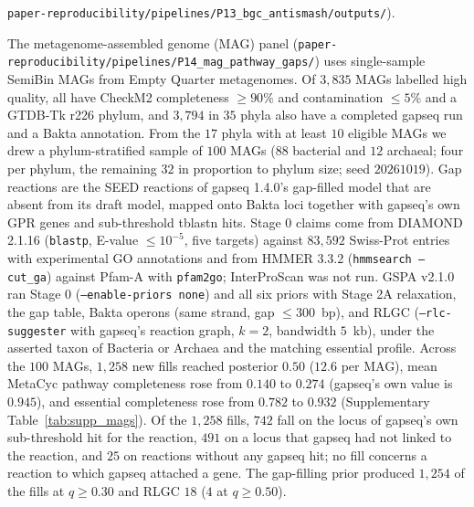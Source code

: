 \documentclass[10pt]{article}
\newcommand{\fn}[1]{\nolinkurl{#1}}
\begin{document}
\fn{paper-reproducibility/pipelines/P13_bgc_antismash/outputs/}).

The metagenome-assembled genome (MAG) panel (\fn{paper-reproducibility/pipelines/P14_mag_pathway_gaps/}) uses single-sample SemiBin MAGs from Empty Quarter metagenomes. Of $3{,}835$ MAGs labelled high quality, all have CheckM2 completeness $\ge 90\%$ and contamination $\le 5\%$ and a GTDB-Tk r226 phylum, and $3{,}794$ in $35$ phyla also have a completed gapseq run and a Bakta annotation. From the $17$ phyla with at least $10$ eligible MAGs we drew a phylum-stratified sample of $100$ MAGs ($88$ bacterial and $12$ archaeal; four per phylum, the remaining $32$ in proportion to phylum size; seed $20261019$). Gap reactions are the SEED reactions of gapseq 1.4.0's gap-filled model that are absent from its draft model, mapped onto Bakta loci together with gapseq's own GPR genes and sub-threshold tblastn hits. Stage 0 claims come from DIAMOND 2.1.16 (\texttt{blastp}, E-value $\le 10^{-5}$, five targets) against $83{,}592$ Swiss-Prot entries with experimental GO annotations and from HMMER 3.3.2 (\texttt{hmmsearch --cut\_ga}) against Pfam-A with \texttt{pfam2go}; InterProScan was not run. GSPA v2.1.0 ran Stage 0 (\texttt{--enable-priors none}) and all six priors with Stage 2A relaxation, the gap table, Bakta operons (same strand, gap $\le 300$~bp), and RLGC (\texttt{--rlc-suggester} with gapseq's reaction graph, $k = 2$, bandwidth $5$~kb), under the asserted taxon of Bacteria or Archaea and the matching essential profile. Across the $100$ MAGs, $1{,}258$ new fills reached posterior $0.50$ ($12.6$ per MAG), mean MetaCyc pathway completeness rose from $0.140$ to $0.274$ (gapseq's own value is $0.945$), and essential completeness rose from $0.782$ to $0.932$ (Supplementary Table~\ref{tab:supp_mags}). Of the $1{,}258$ fills, $742$ fall on the locus of gapseq's own sub-threshold hit for the reaction, $491$ on a locus that gapseq had not linked to the reaction, and $25$ on reactions without any gapseq hit; no fill concerns a reaction to which gapseq attached a gene. The gap-filling prior produced $1{,}254$ of the fills at $q \ge 0.30$ and RLGC $18$ ($4$ at $q \ge 0.50$).
\end{document}

